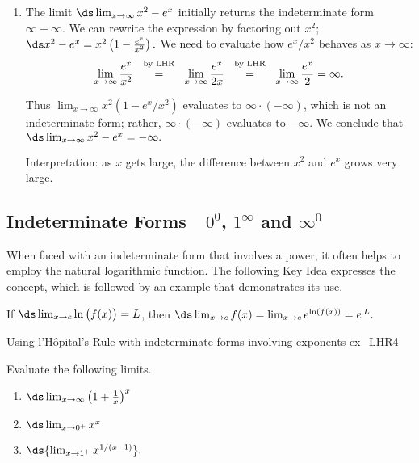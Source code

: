 \begin{solution}
{\begin{enumerate}
Thus $$ \lim_{x\to\infty} \ln(x+1)-\ln x = \lim_{x\to \infty} \ln \left(\frac{x+1}x\right)=0.$$
Interpretation: since this limit evaluates to 0, it means that for large $x$, there is essentially no difference between $\ln (x+1)$ and $\ln x$; their difference is essentially 0.

\item		The limit $\ds \lim_{x\to\infty} x^2-e^x$ initially returns the indeterminate form $\infty-\infty$. We can rewrite the expression by factoring out $x^2$; $\ds x^2-e^x = x^2\left(1-\frac{e^x}{x^2}\right).$ We need to evaluate how $e^x/x^2$ behaves as $x\rightarrow \infty$:
$$\lim_{x\to\infty}\frac{e^x}{x^2} \stackrel{\ \text{ by LHR \rule[-5pt]{0pt}{3pt}} \ }{=} \lim_{x\to\infty} \frac{e^x}{2x} \stackrel{\ \text{ by LHR \rule[-5pt]{0pt}{3pt}} \ }{=} \lim_{x\to\infty} \frac{e^x}{2} = \infty.$$

Thus $\lim_{x\to\infty}x^2(1-e^x/x^2)$ evaluates to $\infty\cdot(-\infty)$, which is not an indeterminate form; rather, $\infty\cdot(-\infty)$ evaluates to $-\infty$. We conclude that 
$\ds \lim_{x\to\infty} x^2-e^x = -\infty.$

Interpretation: as $x$ gets large, the difference between $x^2$ and $e^x$ grows very large.
\end{enumerate}
}
\end{solution}




\subsection*{Indeterminate Forms\ \ $0^0$, $1^\infty$ and $\infty^0$}


When faced with an indeterminate form that involves a power, it often helps to employ the natural logarithmic function. The following Key Idea expresses the concept, which is followed by an example that demonstrates its use.


\begin{formulabox} %
{\label{idea:LHRpower}
If $\ds \lim_{x\to c} \ln\big(f(x)\big) = L$, then 
$\ds \lim_{x\to c} f(x) = \lim_{x\to c} e^{\ln(f(x))} = e\,^L.$ 
}
\end{formulabox}



%


\begin{example}{Using l'H\^opital's Rule with indeterminate forms involving exponents }{ex_LHR4}
{Evaluate the following limits.
\begin{enumerate}
\item $\ds \lim_{x\to\infty} \left(1+\frac1x\right)^x  $ 
\item  $ \ds \lim_{x\to0^+} x^x$
\item $\ds{\lim_{x\to 1^+}x^{1/(x-1)}}.$
\end{enumerate}
}
\end{example}


